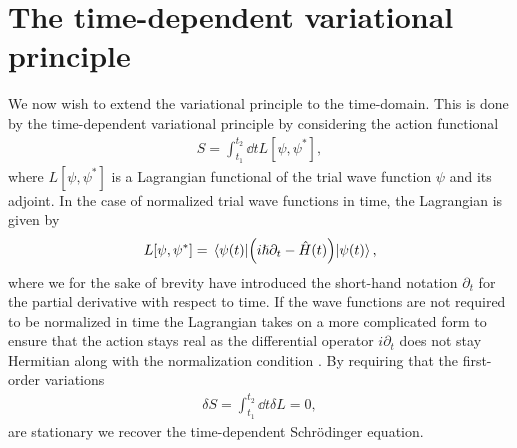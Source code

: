     \section{The time-dependent variational principle}
        \label{sec:tdvp}
        We now wish to extend the variational principle to the time-domain.
        This is done by the time-dependent variational principle by considering
        the action functional
        \begin{align}
            S = \int_{t_1}^{t_2}\dd t L[\psi, \psi^{*}],
        \end{align}
        where $L[\psi, \psi^{*}]$ is a Lagrangian functional of the trial wave
        function $\psi$ and its adjoint.
        In the case of normalized trial wave functions in time, the Lagrangian
        is given by
        \begin{align}
            L[\psi, \psi^{*}]
            =
            \mel*{\psi(t)}{
                \left( 
                    i\hslash\partial_t - \hat{H}(t)
                 \right)
            }{\psi(t)},
        \end{align}
        where we for the sake of brevity have introduced the short-hand notation
        $\partial_t$ for the partial derivative with respect to time.
        If the wave functions are not required to be normalized in time the
        Lagrangian takes on a more complicated form to ensure that the action
        stays real as the differential operator $i\partial_t$ does not stay
        Hermitian along with the normalization condition
        \cite{kramer1981geometry}.
        By requiring that the first-order variations
        \begin{align}
            \delta S
            = \int_{t_1}^{t_2}\dd t \delta L
            = 0,
            \label{eq:stationary-action}
        \end{align}
        are stationary we recover the time-dependent Schrödinger equation.
